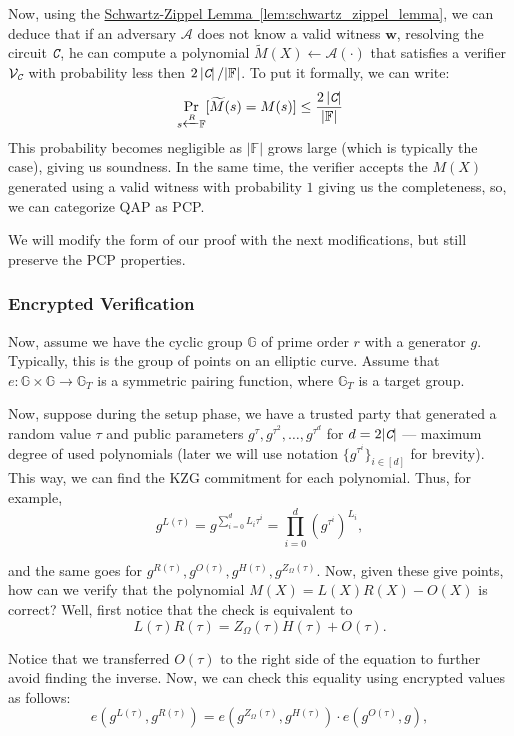 \documentclass[../lecture-notes.tex]{subfiles}
\newcommand{\Circ}{\textit{\texttt{C}}}
\begin{document}
Now, using the \hyperref[lem:schwartz_zippel_lemma]{Schwartz-Zippel Lemma~\ref{lem:schwartz_zippel_lemma}},
we can deduce that if an adversary $\mathcal{A}$ does not know a valid witness $\mathbf{w}$, 
resolving the circuit $\Circ$, he can compute a polynomial $\widetilde{M}(X) \gets \mathcal{A}(\cdot)$ that 
satisfies a verifier $\mathcal{V}_{\Circ}$ with probability less then 
$2 \left| \Circ \right|/|\mathbb{F}|$. To put it formally, we can write:
\begin{equation*}
    \mathop{\text{Pr}}_{s \xleftarrow{R} \mathbb{F}}[\widetilde{M}(s) = M(s)] \leq \frac{2 \left| \Circ \right|}{|\mathbb{F}|}
\end{equation*}
This probability becomes negligible as $|\mathbb{F}|$ grows large (which is typically the case), giving us soundness. In the same time, the
verifier accepts the $M(X)$ generated using a valid witness with probability $1$ giving us the 
completeness, so, we can categorize QAP as PCP. 

We will modify the form of our proof with the next modifications, but still preserve the PCP 
properties.

\subsubsection{Encrypted Verification}

Now, assume we have the cyclic group $\mathbb{G}$ of prime order $r$ with a generator $g$. Typically, this is the group of points on an elliptic curve. Assume that $e: \mathbb{G} \times \mathbb{G} \to \mathbb{G}_T$ is a symmetric pairing function, where $\mathbb{G}_T$ is a target group.

Now, suppose during the setup phase, we have a trusted party that generated a random value $\tau$ and public parameters $g^{\tau},g^{\tau^2},\dots,g^{\tau^{d}}$ for $d=2|\Circ|$ --- maximum degree of used polynomials (later we will use notation $\{g^{\tau^i}\}_{i \in [d]}$ for brevity). This way, we can find the KZG commitment for each polynomial. Thus, for example,
\begin{equation*}
    g^{L(\tau)} = g^{\sum_{i=0}^d L_i \tau^i} = \prod_{i=0}^d (g^{\tau^i})^{L_i},
\end{equation*}

and the same goes for $g^{R(\tau)}, g^{O(\tau)}, g^{H(\tau)}, g^{Z_{\Omega}(\tau)}$. Now, given these give points, how can we verify that the polynomial $M(X) = L(X)R(X) - O(X)$ is correct? Well, first notice that the check is equivalent to
\begin{equation*}
    L(\tau)R(\tau) = Z_\Omega(\tau)H(\tau) + O(\tau).
\end{equation*}

Notice that we transferred $O(\tau)$ to the right side of the equation to further avoid finding the inverse. Now, we can check this equality using encrypted values as follows:
\begin{equation*}
    e(g^{L(\tau)}, g^{R(\tau)}) = e(g^{Z_{\Omega}(\tau)}, g^{H(\tau)}) \cdot e(g^{O(\tau)}, g),
\end{equation*}
\end{document}
